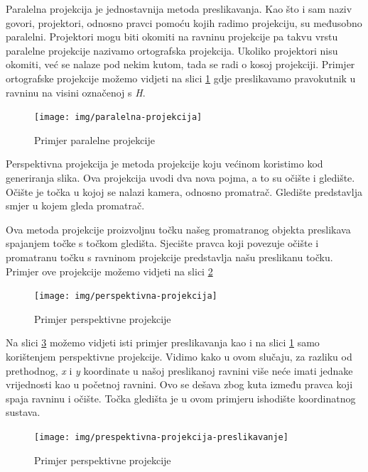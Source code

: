 \documentclass[times, utf8, diplomskirad]{fer}
\begin{document}
Paralelna projekcija je jednostavnija metoda preslikavanja.
Kao što i sam naziv govori, projektori, odnosno pravci pomoću kojih radimo projekciju, su međusobno paralelni.
Projektori mogu biti okomiti na ravninu projekcije pa takvu vrstu paralelne projekcije nazivamo ortografska projekcija.
Ukoliko projektori nisu okomiti, već se nalaze pod nekim kutom, tada se radi o kosoj projekciji.
Primjer ortografske projekcije možemo vidjeti na slici \ref{fig:paralelna-projekcija} gdje preslikavamo pravokutnik u ravninu na visini označenoj s \textit{H}.

\begin{figure}[H]
    \centering
    \texttt{[image: img/paralelna-projekcija]}
    \caption{Primjer paralelne projekcije}
    \label{fig:paralelna-projekcija}
\end{figure}
\newpage

Perspektivna projekcija je metoda projekcije koju većinom koristimo kod generiranja slika.
Ova projekcija uvodi dva nova pojma, a to su očište i gledište.
Očište je točka u kojoj se nalazi kamera, odnosno promatrač.
Gledište predstavlja smjer u kojem gleda promatrač.

Ova metoda projekcije proizvoljnu točku našeg promatranog objekta preslikava spajanjem točke s točkom gledišta.
Sjecište pravca koji povezuje očište i promatranu točku s ravninom projekcije predstavlja našu preslikanu točku.
Primjer ove projekcije možemo vidjeti na slici \ref{fig:perspektivna-projekcija}

\begin{figure}[H]
    \centering
    \texttt{[image: img/perspektivna-projekcija]}
    \caption{Primjer perspektivne projekcije}
    \label{fig:perspektivna-projekcija}
\end{figure}

Na slici \ref{fig:perspektivna-projekcija-preslikavanje} možemo vidjeti isti primjer preslikavanja kao i na slici \ref{fig:paralelna-projekcija} samo korištenjem perspektivne projekcije.
Vidimo kako u ovom slučaju, za razliku od prethodnog, \textit{x} i \textit{y} koordinate u našoj preslikanoj ravnini više neće imati jednake vrijednosti kao u početnoj ravnini.
Ovo se dešava zbog kuta između pravca koji spaja ravninu i očište.
Točka gledišta je u ovom primjeru ishodište koordinatnog sustava.

\begin{figure}[H]
    \centering
    \texttt{[image: img/prespektivna-projekcija-preslikavanje]}
    \caption{Primjer perspektivne projekcije}
    \label{fig:perspektivna-projekcija-preslikavanje}
\end{figure}
\end{document}
